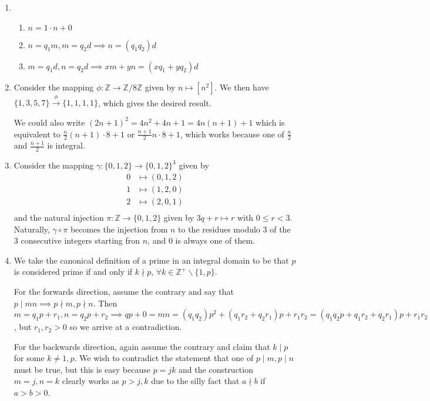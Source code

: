 \documentclass{article}
\theoremstyle{norm}
\begin{document}
\begin{enumerate}
\item \begin{enumerate}
\item $n = 1 \cdot n + 0$
\item $n = q_1 m, m = q_2 d \implies n = (q_1 q_2) d$
\item $m = q_1 d, n = q_2 d \implies xm + yn = (xq_1 + yq_2) d$
\end{enumerate}

\item Consider the mapping $\phi : \mathbb{Z} \to
\mathbb{Z}/8\mathbb{Z}$ given by $n \mapsto \left[n^2\right]$. We then
have $\lbrace 1, 3, 5, 7 \rbrace \xrightarrow{\phi} \lbrace 1, 1, 1, 1
\rbrace$, which gives the desired result.

We could also write $(2n + 1)^2 = 4n^2 + 4n + 1 = 4n(n + 1) + 1$ which
is equivalent to $\frac{n}{2}(n + 1) \cdot 8 + 1$ or $\frac{n + 1}{2} n
\cdot 8 + 1$, which works because one of $\frac{n}{2}$ and $\frac{n +
1}{2}$ is integral.

\item Consider the mapping $\gamma : \lbrace 0, 1, 2 \rbrace \to \lbrace
0, 1, 2 \rbrace^3$ given by
\[ \begin{aligned}
0 &\mapsto (0, 1, 2) \\
1 &\mapsto (1, 2, 0) \\
2 &\mapsto (2, 0, 1) \\
\end{aligned} \]
and the natural injection $\pi : \mathbb{Z} \to \lbrace 0, 1, 2 \rbrace$
given by $3q + r \mapsto r$ with $0 \leq r < 3$. Naturally, $\gamma
\circ \pi$ becomes the injection from $n$ to the residues modulo $3$ of
the $3$ consecutive integers starting fron $n$, and $0$ is always one of
them.

\item We take the canonical definition of a prime in an integral domain
to be that $p$ is considered prime if and only if $k \nmid p$, $\forall
k \in \mathbb{Z}^+ \backslash \lbrace 1, p \rbrace$.

For the forwards direction, assume the contrary and say that $p \mid mn
\implies p \nmid m, p \nmid n$. Then $m = q_1 p + r_1, n = q_2 p + r_2
\implies qp + 0 = mn = (q_1 q_2) p^2 + (q_1 r_2 + q_2 r_1) p + r_1 r_2 =
(q_1 q_2 p + q_1 r_2 + q_2 r_1) p + r_1 r_2 \implies r_1 r_2 = 0$, but
$r_1, r_2 > 0$ so we arrive at a contradiction.

For the backwards direction, again assume the contrary and claim that $k
\mid p$ for some $k \neq 1, p$.  We wish to contradict the statement
that one of $p \mid m, p \mid n$ must be true, but this is easy because
$p = jk$ and the construction $m = j, n = k$ clearly works as $p > j, k$
due to the silly fact that $a \nmid b$ if $a > b > 0$.


\end{enumerate}
\end{document}
